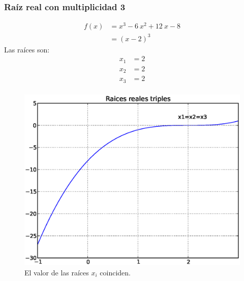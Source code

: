 \begin{frame}[fragile]
\captionsetup{justification=centering}
\frametitle{Raíz real con multiplicidad 3}
\begin{minipage}{5cm}
\fontsize{12}{12}\selectfont
\begin{align*}
f(x) &=  x^{3} - 6 \: x^{2} + 12 \: x - 8 \\
&= (x - 2)^{3}
\end{align*}
Las raíces son:
\begin{align*}
x_{1} &= 2 \\
x_{2} &= 2 \\
x_{3} &= 2 \\
\end{align*}
\end{minipage}
\hspace{0.5cm}
\begin{minipage}{4.5cm}
\begin{figure}
	\centering
	\includegraphics[scale=0.3]{Imagenes/raices02.eps}
	\caption{El valor de las raíces $x_{i}$ coinciden.} 
\end{figure}
\end{minipage}
\end{frame}
